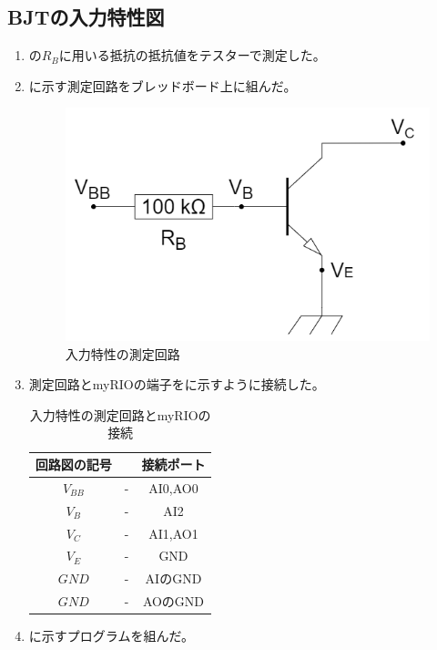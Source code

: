 \documentclass[11pt,dvipdfmx]{jarticle}
\begin{document}
	\subsection{BJTの入力特性図}
		\begin{enumerate}
			\item {}の$R_B$に用いる抵抗の抵抗値をテスターで測定した。
			\item {}に示す測定回路をブレッドボード上に組んだ。
			\begin{figure}[H]
				\centering
				\includegraphics[scale=0.3]{fig/BJT入力特性測定回路.drawio.png}
				\caption{入力特性の測定回路}
				\label{fig:入力特性の測定回路}
			\end{figure}
			\item 測定回路とmyRIOの端子をに示すように接続した。
			\begin{table}[H]
				\centering
				\caption{入力特性の測定回路とmyRIOの接続}
				\begin{tabular}{ccc}
				\hline
				回路図の記号 & &接続ポート \\ \hline\hline
				$V_{BB}$ & - & AI0,AO0 \\
				$V_B$ & - & AI2 \\
				$V_C$ & - & AI1,AO1 \\
				$V_E$ & - & GND \\
				$GND$ & - & AIのGND \\
				$GND$ & - & AOのGND \\
				\hline
				\end{tabular}
				\label{tab:入力特性の測定回路とmyRIOの接続}
			\end{table}
			\item {}に示すプログラムを組んだ。

\end{enumerate}
\end{document}
